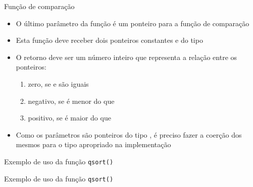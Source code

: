 \begin{frame}[fragile]{Função de comparação}

    \begin{itemize}
        \item O último parâmetro da função  é um ponteiro para a função de
            comparação 

        \item Esta função deve receber dois ponteiros constantes  e  do tipo 

        \item O retorno deve ser um número inteiro que representa a relação entre os ponteiros:
            \begin{enumerate}
                \item zero, se  e  são iguais
                \item negativo, se  é menor do que 
                \item positivo, se  é maior do que 
            \end{enumerate}

        \item Como os parâmetros são ponteiros do tipo , é preciso fazer a 
            coerção dos mesmos para o tipo apropriado na implementação

    \end{itemize}

\end{frame}

\begin{frame}[fragile]{Exemplo de uso da função \texttt{qsort()}}
\end{frame}

\begin{frame}[fragile]{Exemplo de uso da função \texttt{qsort()}}
\end{frame}
